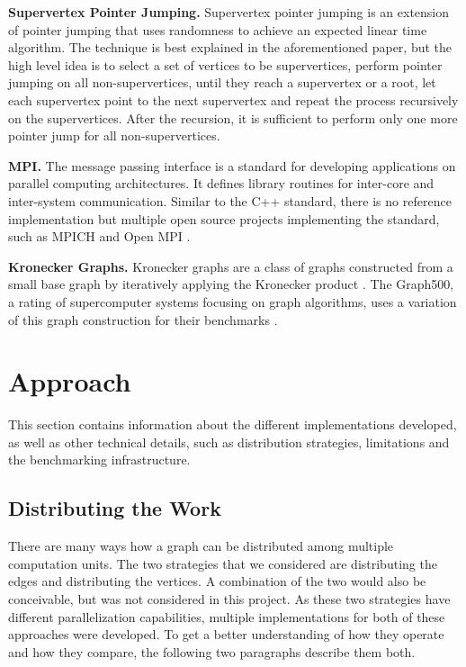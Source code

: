 \documentclass[letterpaper]{article}
\newcommand{\mypar}[1]{{\bf #1.}}
\begin{document}
\mypar{Supervertex Pointer Jumping}
Supervertex \linebreak pointer jumping \cite{chung1996parallel} is an extension of pointer jumping that uses randomness
to achieve an expected linear time algorithm. The technique is best explained in the aforementioned paper, but the high
level idea is to select a set of vertices to be supervertices, perform pointer jumping on all non-supervertices, until
they reach a supervertex or a root, let each supervertex point to the next supervertex and repeat the process
recursively on the supervertices. After the recursion, it is sufficient to perform only one more pointer jump for all
non-supervertices.

\mypar{MPI}
The message passing interface \cite{clarke1994mpi} is a standard for developing applications on parallel computing
architectures. It defines library routines for inter-core and inter-system communication. Similar to the
C++ standard, there is no reference implementation but multiple open source projects implementing the standard, such as
MPICH and Open MPI \cite{gabriel2004open}.

\mypar{Kronecker Graphs}
Kronecker graphs are a class of graphs constructed from a small base graph by iteratively applying the Kronecker product
\cite{leskovec2010kronecker}. The Graph500, a rating of supercomputer systems focusing on graph algorithms, uses a
variation of this graph construction for their benchmarks \cite{graph500}.

\section{Approach}
\label{sec:approach}


This section contains information about the different implementations developed, as well as other technical
details, such as distribution strategies, limitations and the benchmarking infrastructure.

\subsection{Distributing the Work}
There are many ways how a graph can be distributed among multiple computation units. The two strategies that we
considered are distributing the edges and distributing the vertices. A combination of the two would also be conceivable,
but was not considered in this project. As these two strategies have different parallelization capabilities, multiple
implementations for both of these approaches were developed. To get a better understanding of how they operate and how
they compare, the following two paragraphs describe them both.
\end{document}
